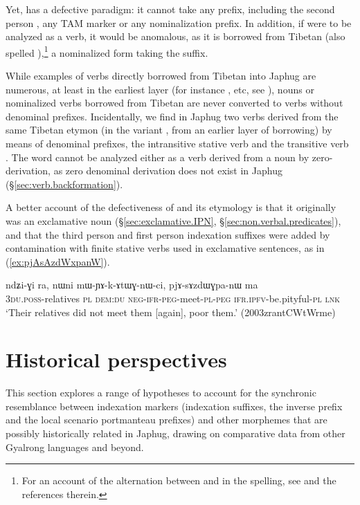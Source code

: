 Yet,  has a defective paradigm: it cannot take any prefix, including the second person , any TAM marker or any nominalization prefix. In addition, if  were to be analyzed as a verb, it would be anomalous, as it is borrowed from Tibetan  (also spelled  ),\footnote{For an account of the alternation between  and  in the spelling, see \citet{hill11hb} and the references therein.} a nominalized form taking the  suffix. 

While examples of verbs directly borrowed from Tibetan into Japhug are numerous, at least in the earliest layer (for instance ,  etc, see \citealt{jacques19contact}), nouns or nominalized verbs borrowed from Tibetan are never converted to verbs without denominal prefixes. Incidentally, we find in Japhug two verbs derived from the same Tibetan etymon (in the variant , from an earlier layer of borrowing) by means of denominal prefixes, the intransitive stative verb  and the transitive verb . The word  cannot be analyzed either as a verb derived from a noun by zero-derivation, as zero denominal derivation does not exist in Japhug (§\ref{sec:verb.backformation}).

A better account of the defectiveness of  and its etymology is that it originally was an exclamative noun (§\ref{sec:exclamative.IPN}, §\ref{sec:non.verbal.predicates}), and that the third person and first person indexation suffixes were added by contamination with finite stative verbs used in exclamative sentences, as  in  (\ref{ex:pjAsAzdWxpanW}).

\begin{exe}
\ex \label{ex:pjAsAzdWxpanW}
\gll ndʑi-ɣi ra, nɯni mɯ-ɲɤ-k-ɤtɯɣ-nɯ-ci, pjɤ-sɤzdɯɣpa-nɯ ma \\
\textsc{3du}.\textsc{poss}-relatives \textsc{pl} \textsc{dem}:\textsc{du} \textsc{neg}-\textsc{ifr}-\textsc{peg}-meet-\textsc{pl}-\textsc{peg} \textsc{ifr}.\textsc{ipfv}-be.pityful-\textsc{pl} \textsc{lnk} \\
\glt `Their relatives did not meet them [again], poor them.' (2003zrantCWtWrme)
\end{exe}

 
\section{Historical perspectives}
This section explores a range of hypotheses to account for the synchronic resemblance between indexation markers (indexation suffixes, the inverse prefix and the local scenario portmanteau prefixes) and other morphemes that are possibly historically related in Japhug, drawing on comparative data from other Gyalrong languages and beyond.

